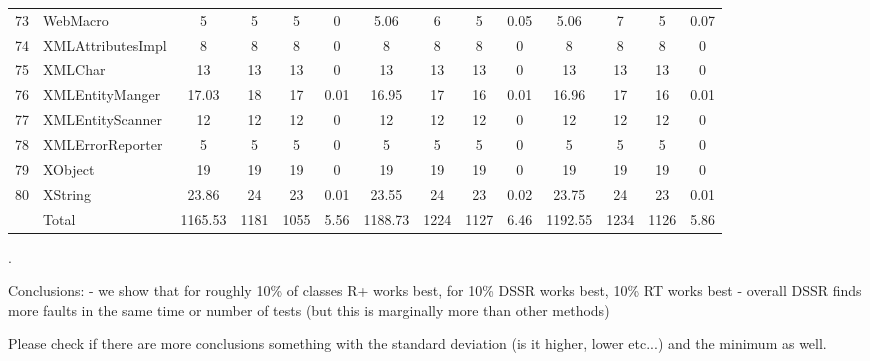 \documentclass[conference]{IEEEtran}
\begin{document}
\begin{table} [ht]
{\begin{tabular}{|c|l|c|c|c|c|c|c|c|c|c|c|c|c|}
 73						& WebMacro					& 5	&	5	&	5	& 		0					& 5.06	&  6		& 5		& 		0.05			& 5.06		& 7			& 5			&	0.07\\      
 74						& XMLAttributesImpl				& 8	&	8	&	8	& 		0					& 8		&  8		& 8		& 		0			& 8			& 8			& 8			&	0\\      
 75						& XMLChar					& 13	&	13	&	13	& 		0					& 13		&  13		& 13		& 		0			& 13			& 13			& 13			&	0\\      
 76						& XMLEntityManger				& 17.03&	18	&	17	& 		0.01					& 16.95	&  17		& 16		& 		0.01			& 16.96		& 17			& 16			&	0.01\\      
 77						& XMLEntityScanner				& 12	&	12	&	12	& 		0					& 12		&  12		& 12		& 		0			& 12			& 12			& 12			&	0\\      
 78						& XMLErrorReporter				& 5	&	5	&	5	& 		0					& 5		&  5		& 5		& 		0			& 5			& 5			& 5			&	0\\      
 79						& XObject						& 19	&	19	&	19	& 		0					& 19		&  19		& 19		& 		0			& 19			& 19			& 19			&	0\\      
 80						& XString						& 23.86&	24	&	23	& 		0.01					& 23.55	&  24		& 23		& 		0.02			& 23.75		& 24			& 23			&	0.01\\      
    \hline 
    						& Total						&1165.53	& 1181	&    1055	&		5.56					& 1188.73		&	1224	&	1127	&	6.46			& 1192.55		& 1234		& 1126		& 	5.86\\
   \hline
     \end{tabular}
    \label{table:Results}
     }
     \end{table}
\newpage.





Conclusions: 
- we show that for roughly 10\% of classes R+ works best, for 10\% DSSR works best, 10\% RT works best
- overall DSSR finds more faults in the same time or number of tests (but this is marginally more than other methods)


Please check if there are more conclusions something with the standard deviation (is it higher, lower etc...) and the minimum as well.
\end{document}
